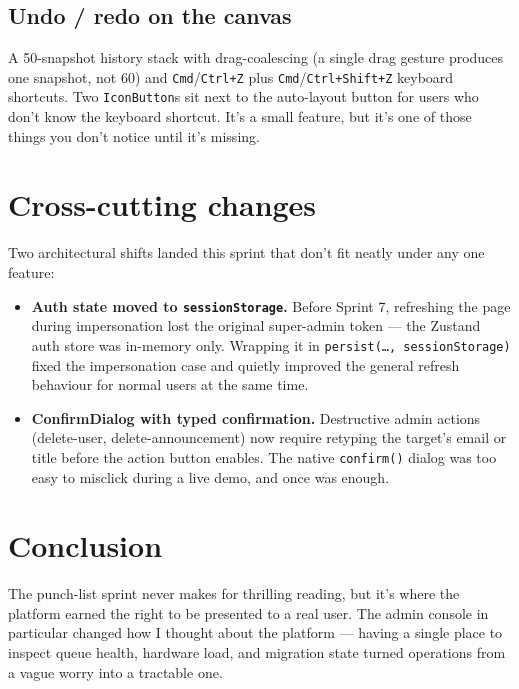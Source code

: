 \documentclass[12pt, a4paper]{report}
\begin{document}
\subsection{Undo / redo on the canvas}

A 50-snapshot history stack with drag-coalescing (a single drag
gesture produces one snapshot, not 60) and \texttt{Cmd}/\texttt{Ctrl+Z}
plus \texttt{Cmd}/\texttt{Ctrl+Shift+Z} keyboard shortcuts. Two
\texttt{IconButton}s sit next to the auto-layout button for users
who don't know the keyboard shortcut. It's a small feature, but it's
one of those things you don't notice until it's missing.

\section{Cross-cutting changes}

Two architectural shifts landed this sprint that don't fit neatly
under any one feature:

\begin{itemize}
    \item \textbf{Auth state moved to \texttt{sessionStorage}.} Before
        Sprint 7, refreshing the page during impersonation lost the
        original super-admin token --- the Zustand auth store was
        in-memory only. Wrapping it in
        \texttt{persist(\ldots,\,sessionStorage)} fixed the
        impersonation case and quietly improved the general refresh
        behaviour for normal users at the same time.
    \item \textbf{ConfirmDialog with typed confirmation.} Destructive
        admin actions (delete-user, delete-announcement) now require
        retyping the target's email or title before the action button
        enables. The native \texttt{confirm()} dialog was too easy to
        misclick during a live demo, and once was enough.
\end{itemize}

\section*{Conclusion}

The punch-list sprint never makes for thrilling reading, but it's
where the platform earned the right to be presented to a real user.
The admin console in particular changed how I thought about the
platform --- having a single place to inspect queue health, hardware
load, and migration state turned operations from a vague worry into a
tractable one.
\end{document}
